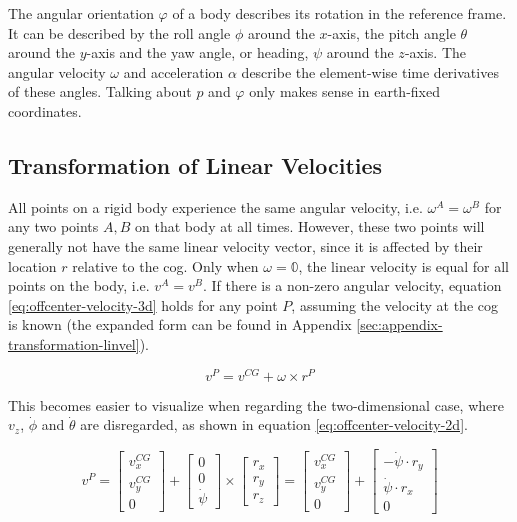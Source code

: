 The angular orientation $\varphi$ of a body describes its rotation in the reference frame. It can be described by the roll angle $\phi$ around the $x$-axis, the pitch angle $\theta$ around the $y$-axis and the yaw angle, or heading, $\psi$ around the $z$-axis. The angular velocity $\omega$ and acceleration $\alpha$ describe the element-wise time derivatives of these angles. Talking about $p$ and $\varphi$ only makes sense in earth-fixed coordinates.


\subsection{Transformation of Linear Velocities}
All points on a rigid body experience the same angular velocity, i.e. $\omega^A = \omega^B$ for any two points $A, B$ on that body at all times. However, these two points will generally not have the same linear velocity vector, since it is affected by their location $r$ relative to the \gls{cog}. Only when $\omega = \mathbb{0}$, the linear velocity is equal for all points on the body, i.e. $v^A = v^B$. If there is a non-zero angular velocity, equation \ref{eq:offcenter-velocity-3d} holds for any point $P$, assuming the velocity at the \gls{cog} is known (the expanded form can be found in Appendix \ref{sec:appendix-transformation-linvel}).

\begin{equation}\label{eq:offcenter-velocity-3d}%
v^P = v^{CG} + \omega \times r^P%
\end{equation}

This becomes easier to visualize when regarding the two-dimensional case, where $v_z$, $\dot{\phi}$ and $\dot{\theta}$ are disregarded, as shown in equation \ref{eq:offcenter-velocity-2d}.

\begin{equation}\label{eq:offcenter-velocity-2d}%
v^P%
= \begin{bmatrix}v_x^{CG} \\ v_y^{CG} \\ 0\end{bmatrix} + \begin{bmatrix}0 \\ 0 \\ \dot{\psi}\end{bmatrix} \times \begin{bmatrix}r_x \\ r_y \\ r_z\end{bmatrix}%
= \begin{bmatrix}v_x^{CG} \\ v_y^{CG} \\ 0\end{bmatrix} + \begin{bmatrix}-\dot{\psi} \cdot r_y \\ \dot{\psi} \cdot r_x \\ 0\end{bmatrix}%
 \end{equation}

